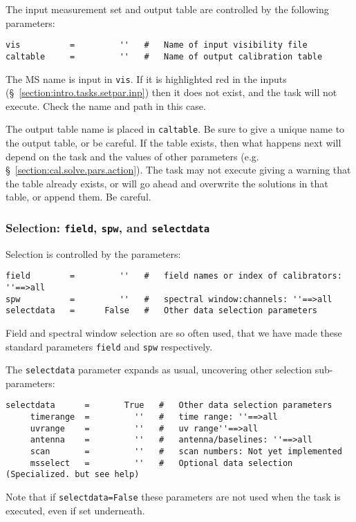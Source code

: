 The input measurement set and output table are
controlled by the following parameters:
\small
\begin{verbatim}
vis          =         ''   #   Name of input visibility file
caltable     =         ''   #   Name of output calibration table
\end{verbatim}
\normalsize

The MS name is input in {\tt vis}.  If it is highlighted red
in the inputs (\S~\ref{section:intro.tasks.setpar.inp}) then it 
does not exist, and the task will not execute.  Check the name and
path in this case. 

The output table name is placed in {\tt caltable}.  Be sure to give a
unique name to the output table, or be careful.  If the table exists,
then what happens next will depend on the task and the values of other
parameters (e.g.  \S~\ref{section:cal.solve.pars.action}).  The task
may not execute giving a warning that the table already exists, or
will go ahead and overwrite the solutions in that table, or append
them.  Be careful.

\subsubsection{Selection: {\tt field}, {\tt spw},
and {\tt selectdata} }
\label{section:cal.solve.pars.select}

Selection is controlled by the parameters:
\small
\begin{verbatim}
field        =         ''   #   field names or index of calibrators: ''==>all
spw          =         ''   #   spectral window:channels: ''==>all 
selectdata   =      False   #   Other data selection parameters
\end{verbatim}
\normalsize

Field and spectral window selection are so often used, that we have
made these standard parameters {\tt field} and {\tt spw} respectively.

The {\tt selectdata} parameter expands as usual, uncovering other
selection sub-parameters:
\small
\begin{verbatim}
selectdata      =       True   #   Other data selection parameters
     timerange  =         ''   #   time range: ''==>all 
     uvrange    =         ''   #   uv range''==>all 
     antenna    =         ''   #   antenna/baselines: ''==>all 
     scan       =         ''   #   scan numbers: Not yet implemented
     msselect   =         ''   #   Optional data selection (Specialized. but see help)
\end{verbatim}
\normalsize
Note that if {\tt selectdata=False} these parameters are not used when
the task is executed, even if set underneath.

